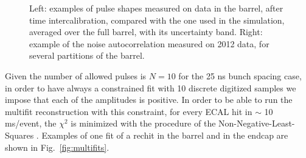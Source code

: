 \documentclass[journal]{IEEEtran}
\begin{document}
%
\begin{figure}[!t]
  \begin{center}
    \caption{Left: examples of pulse shapes measured on data in the barrel, after time intercalibration, compared with the one used in the simulation, averaged over the full barrel, with its uncertainty band. Right: example of the noise autocorrelation measured on 2012 data, for several partitions of the barrel. \label{fig:pulse_shapes} }
  \end{center}
\end{figure}
%
Given the number of allowed pulses is $N=10$ for the 25 ns bunch spacing case, in order to have always a constrained fit with 10 discrete digitized samples we impose that each of the amplitudes is positive. In order to be able to run the multifit reconstruction with this constraint, for every ECAL hit in $\sim$ 10 ms/event, the $\chi^2$ is minimized with the procedure of the Non-Negative-Least-Squares \cite{nnls}. Examples of one fit of a rechit in the barrel and in the endcap are shown in Fig.~\ref{fig:multifits}.
%
\end{document}
